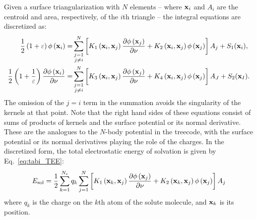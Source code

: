 \documentclass[12pt,titlepage]{article}
\begin{document}
Given a surface triangularization with $N$ elements -- where ${\bf x}_i$ and $A_i$ are the centroid and area, respectively, of the $i$th triangle -- the integral equations are discretized as:
%
\begin{equation}
	\begin{split}
		\frac{1}{2}\left(1+\varepsilon\right)\phi\left({\bf x}_i\right) =& \sum_{\substack{j=1 \\ j\neq i}}^N \left[K_1\left({\bf x}_i, {\bf x}_j\right) \frac{\partial \phi\left({\bf x}_j\right)}{\partial \nu} + K_2\left({\bf x}_i, {\bf x}_j\right) \phi\left({\bf x}_j\right) \right]A_j + S_1({\bf x}_i), \\ %
		\frac{1}{2}\left(1+\frac{1}{\varepsilon}\right) \frac{\partial \phi\left({\bf x}_i\right)}{\partial \nu} =& \sum_{\substack{j=1 \\ j\neq i}}^N \left[K_3\left({\bf x}_i, {\bf x}_j\right) \frac{\partial \phi\left({\bf x}_j\right)}{\partial \nu} + K_4\left({\bf x}_i, {\bf x}_j\right) \phi\left({\bf x}_j\right) \right]A_J + S_2({\bf x}_I).
	\end{split}
\end{equation}
%
The omission of the $j=i$ term in the summation avoids the singularity of the kernels at that point.
Note that the right hand sides of these equations consist of sums of products of kernels and the surface potential or its normal derivative.
These are the analogues to the $N$-body potential in the treecode, with the surface potential or its normal derivatives playing the role of the charges.
In the discretized form, the total electrostatic energy of solvation is given by Eq.~\ref{eq:tabi_TEE}:
%
\begin{equation}
	E_\text{sol}=\frac{1}{2}\sum_{k=1}^{N_c}q_k\sum_{j=1}^N \left[K_1\left({\bf x}_k, {\bf x}_j\right) \frac{\partial \phi\left({\bf x}_j\right)}{\partial \nu} + K_2\left({\bf x}_k, {\bf x}_j\right) \phi\left({\bf x}_j\right) \right]A_j
	\label{eq:tabi_TEE}
\end{equation}
%
where $q_k$ is the charge on the $k$th atom of the solute molecule, and ${\bf x}_k$ is its position.
\end{document}
